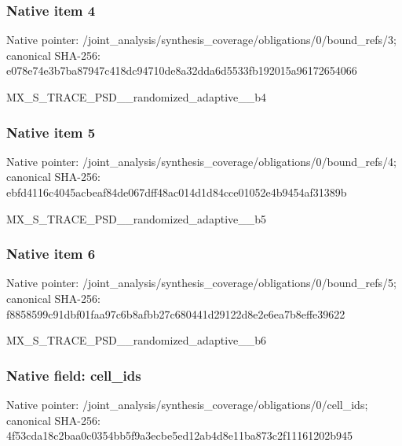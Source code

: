 \documentclass[10pt,a4paper]{article}
\begin{document}
\subsubsection{Native item 4}
Native pointer: /joint\_\allowbreak{}analysis/synthesis\_\allowbreak{}coverage/obligations/0/bound\_\allowbreak{}refs/3; canonical SHA-256: e078e74e3b7ba87947c418dc94710de8a32dda6d5533fb192015a96172654066

\begingroup\raggedright\sloppy MX\_\allowbreak{}S\_\allowbreak{}TRACE\_\allowbreak{}PSD\_\allowbreak{}\_\allowbreak{}randomized\_\allowbreak{}adaptive\_\allowbreak{}\_\allowbreak{}b4\par\endgroup

\subsubsection{Native item 5}
Native pointer: /joint\_\allowbreak{}analysis/synthesis\_\allowbreak{}coverage/obligations/0/bound\_\allowbreak{}refs/4; canonical SHA-256: ebfd4116c4045acbeaf84de067dff48ac014d1d84cce01052e4b9454af31389b

\begingroup\raggedright\sloppy MX\_\allowbreak{}S\_\allowbreak{}TRACE\_\allowbreak{}PSD\_\allowbreak{}\_\allowbreak{}randomized\_\allowbreak{}adaptive\_\allowbreak{}\_\allowbreak{}b5\par\endgroup

\subsubsection{Native item 6}
Native pointer: /joint\_\allowbreak{}analysis/synthesis\_\allowbreak{}coverage/obligations/0/bound\_\allowbreak{}refs/5; canonical SHA-256: f8858599c91dbf01faa97c6b8afbb27c680441d29122d8e2e6ea7b8effe39622

\begingroup\raggedright\sloppy MX\_\allowbreak{}S\_\allowbreak{}TRACE\_\allowbreak{}PSD\_\allowbreak{}\_\allowbreak{}randomized\_\allowbreak{}adaptive\_\allowbreak{}\_\allowbreak{}b6\par\endgroup

\subsubsection{Native field: cell\_\allowbreak{}ids}
Native pointer: /joint\_\allowbreak{}analysis/synthesis\_\allowbreak{}coverage/obligations/0/cell\_\allowbreak{}ids; canonical SHA-256: 4f53cda18c2baa0c0354bb5f9a3ecbe5ed12ab4d8e11ba873c2f11161202b945
\end{document}
